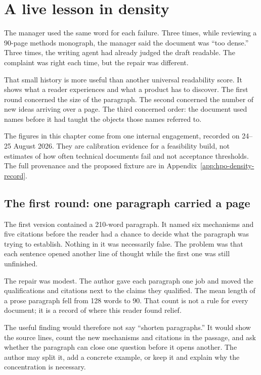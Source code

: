 \chapter{A live lesson in density}
\label{ch:hpo-density}

The manager used the same word for each failure. Three times, while reviewing
a 90-page methods monograph, the manager said the document was
``too dense.'' Three times, the writing agent had already judged the draft
readable. The complaint was right each time, but the repair was different.

That small history is more useful than another universal readability score. It
shows what a reader experiences and what a product has to discover. The first
round concerned the size of the paragraph. The second concerned the number of
new ideas arriving over a page. The third concerned order: the document used
names before it had taught the objects those names referred to.

The figures in this chapter come from one internal engagement, recorded on
24--25 August 2026. They are calibration evidence for a feasibility build,
not estimates of how often technical documents fail and not acceptance
thresholds. The full provenance and the proposed fixture are in
Appendix~\ref{app:hpo-density-record}.

\hvFigureHpoRounds

\section{The first round: one paragraph carried a page}
\label{sec:hpo-packing}

The first version contained a 210-word paragraph. It named six mechanisms and
five citations before the reader had a chance to decide what the paragraph was
trying to establish. Nothing in it was necessarily false. The problem was
that each sentence opened another line of thought while the first one was
still unfinished.

The repair was modest. The author gave each paragraph one job and moved the
qualifications and citations next to the claims they qualified. The mean
length of a prose paragraph fell from 128 words to 90. That count is not a
rule for every document; it is a record of where this reader found relief.

The useful finding would therefore not say ``shorten paragraphs.'' It would
show the source lines, count the new mechanisms and citations in the passage,
and ask whether the paragraph can close one question before it opens another.
The author may split it, add a concrete example, or keep it and explain why
the concentration is necessary.

